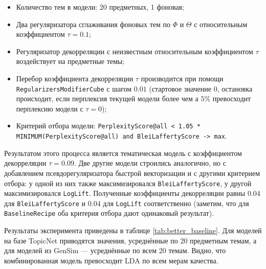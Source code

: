 \begin{itemize}

    \item Количество тем в модели: 20 предметных, 1 фоновая;

    \item Два регуляризатора сглаживания фоновых тем по $\Phi$ и $\Theta$ с относительным коэффициентом $\tau=0.1$;

    \item Регуляризатор декорреляции с неизвестным относительным коэффициентом $\tau$ воздействует на предметные темы;

    \item Перебор коэффициента декорреляции $\tau$ производится при помощи \texttt{RegularizersModifierCube} с шагом $0.01$ (стартовое значение $0$, остановка происходит, если перплексия текущей модели более чем а $5\%$ превосходит перплексию модели с $\tau=0$);

    \item Критерий отбора модели: \texttt{PerplexityScore@all < 1.05 * MINIMUM(PerplexityScore@all) and BleiLaffertyScore -> max}.

\end{itemize} 

Результатом этого процесса является тематическая модель с коэффициентом декорреляции $\tau=0.09$. Две другие модели строились аналогично, но с добавлением псевдорегуляризатора быстрой векторизации и с другими критерием отбора: у одной из них также максимизировался \texttt{BleiLaffertyScore}, у другой максимизировался \texttt{LogLift}. Полученные коэффициенты декорреляции равны $0.04$ для \texttt{BleiLaffertyScore} и $0.04$ для \texttt{LogLift} соответственно (заметим, что для \texttt{BaselineRecipe} оба критерия отбора дают одинаковый результат).  

Результаты эксперимента приведены в таблице \ref{tab:better_baseline}. Для моделей на базе TopicNet приводятся значения, усреднённые по 20 предметным темам, а для моделей из GenSim --- усреднённые по всем 20 темам. Видно, что комбинированная модель превосходит LDA по всем мерам качества.  


